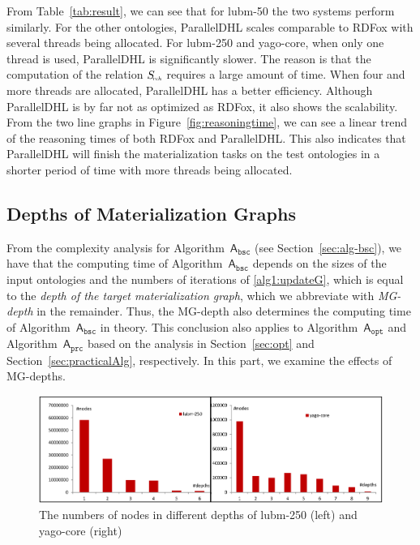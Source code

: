 From Table~\ref{tab:result}, we can see that for lubm-50 the two systems perform similarly.
For the other ontologies, ParallelDHL scales comparable to RDFox with several threads being allocated.
For lubm-250 and yago-core, when only one thread is used, ParallelDHL
is significantly slower.
The reason is that the computation of the relation $S_{\textit{\!\tiny rch}}$ requires a large amount of time. When
four and more threads are allocated, ParallelDHL has a better efficiency.
Although ParallelDHL is by far not as optimized as RDFox, it also shows the scalability.
From the two line graphs in Figure~\ref{fig:reasoningtime},
we can see a linear trend of the reasoning times of both RDFox and ParallelDHL.
This also indicates that ParallelDHL will finish the materialization tasks on the test ontologies
in a shorter period of time with more threads being allocated.

\subsection{Depths of Materialization Graphs}

From the complexity analysis for Algorithm~$\mathsf{A}_{\texttt{bsc}}$ (see Section~\ref{sec:alg-bsc}),
we have that the computing time of
Algorithm~$\mathsf{A}_{\texttt{bsc}}$ depends on the sizes of the input ontologies and the
numbers of iterations of \ref{alg1:updateG},
which is equal to the \emph{depth of the target materialization
  graph}, which we abbreviate with \emph{MG-depth} in the remainder.
Thus, the MG-depth also determines the computing time of
Algorithm~$\mathsf{A}_{\texttt{bsc}}$ in theory.
This conclusion also applies to Algorithm~$\mathsf{A}_{\texttt{opt}}$ and Algorithm~$\mathsf{A}_{\texttt{prc}}$
based on the analysis in Section~\ref{sec:opt} and Section~\ref{sec:practicalAlg}, respectively.
In this part, we examine the effects of MG-depths.

\begin{figure}[htbp]
\begin{center}
\includegraphics[width=1\textwidth]{fig-graphdepth.eps}
\caption{The numbers of nodes in different depths of lubm-250 (left)
  and yago-core (right) }
\label{fig:graphdepth}
\end{center}
\end{figure}

